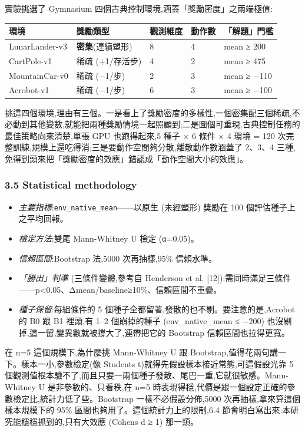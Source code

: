 實驗挑選了 Gymnasium 四個古典控制環境,涵蓋「獎勵密度」之兩端極值:

{\def\LTcaptype{none} %
\begin{longtable}[]{@{}lllll@{}}
\toprule\noalign{}
環境 & 獎勵類型 & 觀測維度 & 動作數 & 「解題」門檻 \\
\midrule\noalign{}
\endhead
\bottomrule\noalign{}
\endlastfoot
LunarLander-v3 & \textbf{密集}(連續塑形) & 8 & 4 & mean ≥ 200 \\
CartPole-v1 & 稀疏 (+1/存活步) & 4 & 2 & mean ≥ 475 \\
MountainCar-v0 & 稀疏 (−1/步) & 2 & 3 & mean ≥ −110 \\
Acrobot-v1 & 稀疏 (−1/步) & 6 & 3 & mean ≥ −100 \\
\end{longtable}
}

挑這四個環境,理由有三個。一是看上了獎勵密度的多樣性,一個密集配三個稀疏,不必動到其他變數,就能把兩種獎勵情境一起照顧到;二是圖個可重現,古典控制任務的最佳策略向來清楚,單張 GPU 也跑得起來,5 種子 × 6 條件 × 4 環境 = 120 次完整訓練,規模上還吃得消;三是要動作空間夠分散,離散動作數涵蓋了 2、3、4 三種,免得到頭來把「獎勵密度的效應」錯認成「動作空間大小的效應」。

\subsubsection{3.5 Statistical methodology}\label{35-statistical-methodology}

\begin{itemize}
\tightlist
\item
  \emph{主要指標}:\texttt{env\_native\_mean}------以原生 (未經塑形) 獎勵在 100 個評估種子上之平均回報。
\item
  \emph{檢定方法}:雙尾 Mann-Whitney U 檢定 (α=0.05)。
\item
  \emph{信賴區間}:Bootstrap 法,5000 次再抽樣,95\% 信賴水準。
\item
  \emph{「勝出」判準} (三條件變體,參考自 Henderson et al. {[}12{]}):需同時滿足三條件------p\textless0.05、\textbar Δmean\textbar/\textbar baseline\textbar≥10\%、信賴區間不重疊。
\item
  \emph{種子保留}:每組條件的 5 個種子全都留著,發散的也不剔。要注意的是,Acrobot 的 B0 跟 B1 裡頭,有 1--2 個崩掉的種子 (env\_native\_mean ≤ −200) 也沒剔掉,這一留,變異數就被撐大了,連帶把它的 Bootstrap 信賴區間也拉得更寬。
\end{itemize}

在 n=5 這個規模下,為什麼挑 Mann-Whitney U 跟 Bootstrap,值得花兩句講一下。樣本一小,參數檢定(像 Student\textquotesingle s t)就得先假設樣本接近常態,可這假設光靠 5 個觀測值根本驗不了,而且只要一兩個種子發散、尾巴一重,它就很敏感。Mann-Whitney U 是非參數的、只看秩,在 n=5 時表現得穩,代價是跟一個設定正確的參數檢定比,統計力低了些。Bootstrap 一樣不必假設分佈,5000 次再抽樣,拿來算這個樣本規模下的 95\% 區間也夠用了。這個統計力上的限制,6.4 節會明白寫出來:本研究能穩穩抓到的,只有大效應 (Cohen\textquotesingle s d ≥ 1) 那一類。

